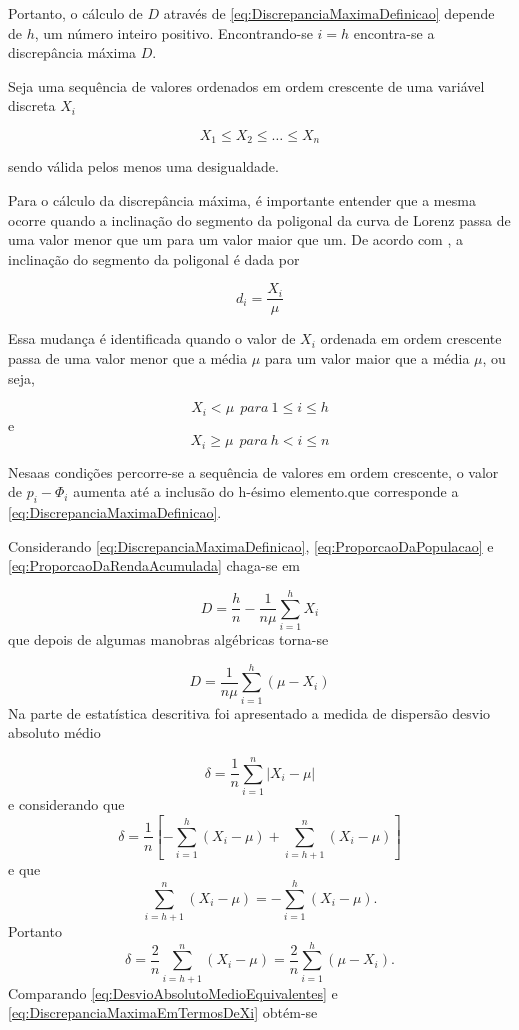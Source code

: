 \documentclass[
]{book}
\begin{document}
Portanto, o cálculo de \(D\) através de \eqref{eq:DiscrepanciaMaximaDefinicao} depende de \(h\), um número inteiro positivo. Encontrando-se \(i=h\) encontra-se a discrepância máxima \(D\).

Seja uma sequência de valores ordenados em ordem crescente de uma variável discreta \(X_i\)

\[
  X_1 \leq X_2 \leq \ldots \leq X_n
\]

sendo válida pelos menos uma desigualdade.

Para o cálculo da discrepância máxima, é importante entender que a mesma ocorre quando a inclinação do segmento da poligonal da curva de Lorenz passa de uma valor menor que um para um valor maior que um. De acordo com \citet{Hoffmann2006}, a inclinação do segmento da poligonal é dada por

\[
  d_i = \dfrac{X_i}{\mu}
\]

Essa mudança é identificada quando o valor de \(X_i\) ordenada em ordem crescente passa de uma valor menor que a média \(\mu\) para um valor maior que a média \(\mu\), ou seja,

\[
  X_i < \mu~~para~1 \leq i \leq h
\]
e
\[
  X_i \geq \mu~~para~h < i \leq n
\]

Nesaas condições percorre-se a sequência de valores em ordem crescente, o valor de \(p_i - \Phi_i\) aumenta até a inclusão do h-ésimo elemento.que corresponde a \eqref{eq:DiscrepanciaMaximaDefinicao}.

Considerando \eqref{eq:DiscrepanciaMaximaDefinicao}, \eqref{eq:ProporcaoDaPopulacao} e \eqref{eq:ProporcaoDaRendaAcumulada} chaga-se em

\[
  D = \dfrac{h}{n} - \dfrac{1}{n\mu}\sum_{i=1}^{h}X_i
\]
que depois de algumas manobras algébricas torna-se

\[
  D = \dfrac{1}{n\mu}\sum_{i=1}^{h}(\mu - X_i)
\label{eq:DiscrepanciaMaximaEmTermosDeXi}
\]
Na parte de estatística descritiva foi apresentado a medida de dispersão desvio absoluto médio

\[
  \delta = \dfrac{1}{n}\sum_{i=1}^{n}|X_i - \mu|
\]
e considerando que
\[
  \delta = \dfrac{1}{n}\left[ -\sum_{i=1}^{h}\left(X_i - \mu\right) + \sum_{i=h+1}^{n}\left(X_i - \mu\right)\right]
\]
e que
\[
  \sum_{i=h+1}^{n}\left(X_i - \mu\right) = -\sum_{i=1}^{h}\left(X_i - \mu\right).
\]
Portanto
\[
\delta = \dfrac{2}{n}\sum_{i=h+1}^{n}\left(X_i - \mu\right) = \dfrac{2}{n}\sum_{i=1}^{h}\left(\mu - X_i \right).
\label{eq:DesvioAbsolutoMedioEquivalentes}
\]
Comparando \eqref{eq:DesvioAbsolutoMedioEquivalentes} e \eqref{eq:DiscrepanciaMaximaEmTermosDeXi} obtém-se
\end{document}

